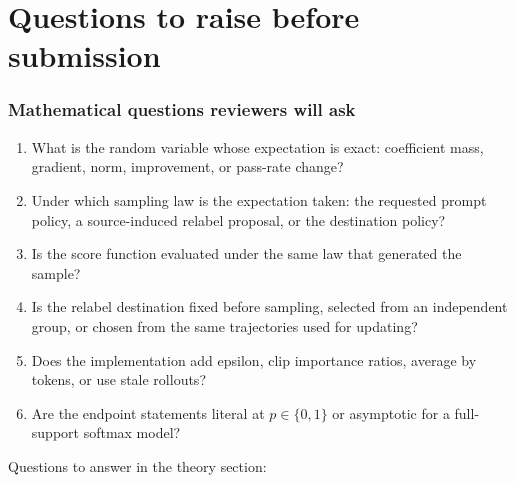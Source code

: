 \documentclass[11pt]{article}
\theoremstyle{definition}
\theoremstyle{remark}
\begin{document}
\part{Questions to raise before submission}

\section{Mathematical questions reviewers will ask}

\begin{questionbox}[title={\textbf{Before using the word ``exact''}}]
\begin{enumerate}[leftmargin=2em]
\item What is the random variable whose expectation is exact: coefficient mass, gradient, norm, improvement, or pass-rate change?
\item Under which sampling law is the expectation taken: the requested prompt policy, a source-induced relabel proposal, or the destination policy?
\item Is the score function evaluated under the same law that generated the sample?
\item Is the relabel destination fixed before sampling, selected from an independent group, or chosen from the same trajectories used for updating?
\item Does the implementation add epsilon, clip importance ratios, average by tokens, or use stale rollouts?
\item Are the endpoint statements literal at $p\in\{0,1\}$ or asymptotic for a full-support softmax model?
\end{enumerate}
\end{questionbox}

Questions to answer in the theory section:
\end{document}
